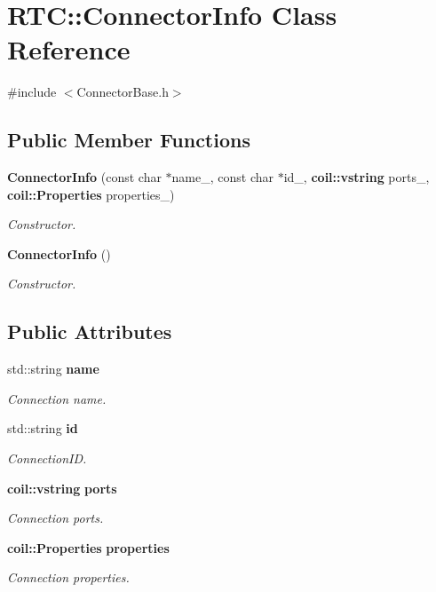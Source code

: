 \section{RTC::ConnectorInfo Class Reference}
\label{classRTC_1_1ConnectorInfo}


{\ttfamily \#include $<$ConnectorBase.h$>$}

\subsection*{Public Member Functions}
\begin{DoxyCompactItemize}
\item 
{\bf ConnectorInfo} (const char $\ast$name\_\-, const char $\ast$id\_\-, {\bf coil::vstring} ports\_\-, {\bf coil::Properties} properties\_\-)
\begin{DoxyCompactList}\small\item\em Constructor. \item\end{DoxyCompactList}\item 
{\bf ConnectorInfo} ()
\begin{DoxyCompactList}\small\item\em Constructor. \item\end{DoxyCompactList}\end{DoxyCompactItemize}
\subsection*{Public Attributes}
\begin{DoxyCompactItemize}
\item 
std::string {\bf name}
\begin{DoxyCompactList}\small\item\em Connection name. \item\end{DoxyCompactList}\item 
std::string {\bf id}
\begin{DoxyCompactList}\small\item\em ConnectionID. \item\end{DoxyCompactList}\item 
{\bf coil::vstring} {\bf ports}
\begin{DoxyCompactList}\small\item\em Connection ports. \item\end{DoxyCompactList}\item 
{\bf coil::Properties} {\bf properties}
\begin{DoxyCompactList}\small\item\em Connection properties. \item\end{DoxyCompactList}\end{DoxyCompactItemize}


